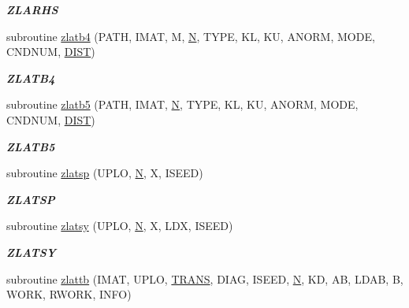 \begin{DoxyCompactItemize}
\begin{DoxyCompactList}\small\item\em {\bfseries Z\+L\+A\+R\+H\+S} \end{DoxyCompactList}\item 
subroutine \hyperlink{group__complex16__lin_gacb8311402101469baef52e042bd23703}{zlatb4} (P\+A\+T\+H, I\+M\+A\+T, M, \hyperlink{polmisc_8c_a0240ac851181b84ac374872dc5434ee4}{N}, T\+Y\+P\+E, K\+L, K\+U, A\+N\+O\+R\+M, M\+O\+D\+E, C\+N\+D\+N\+U\+M, \hyperlink{superlu__enum__consts_8h_af00a42ecad444bbda75cde1b64bd7e72ac04fbbdf0d80a4ad25e565541deeebd7}{D\+I\+S\+T})
\begin{DoxyCompactList}\small\item\em {\bfseries Z\+L\+A\+T\+B4} \end{DoxyCompactList}\item 
subroutine \hyperlink{group__complex16__lin_gaea342a83761879ef6a3174f201824b5e}{zlatb5} (P\+A\+T\+H, I\+M\+A\+T, \hyperlink{polmisc_8c_a0240ac851181b84ac374872dc5434ee4}{N}, T\+Y\+P\+E, K\+L, K\+U, A\+N\+O\+R\+M, M\+O\+D\+E, C\+N\+D\+N\+U\+M, \hyperlink{superlu__enum__consts_8h_af00a42ecad444bbda75cde1b64bd7e72ac04fbbdf0d80a4ad25e565541deeebd7}{D\+I\+S\+T})
\begin{DoxyCompactList}\small\item\em {\bfseries Z\+L\+A\+T\+B5} \end{DoxyCompactList}\item 
subroutine \hyperlink{group__complex16__lin_gaaa1d73e40a1923d773364071f0d868c6}{zlatsp} (U\+P\+L\+O, \hyperlink{polmisc_8c_a0240ac851181b84ac374872dc5434ee4}{N}, X, I\+S\+E\+E\+D)
\begin{DoxyCompactList}\small\item\em {\bfseries Z\+L\+A\+T\+S\+P} \end{DoxyCompactList}\item 
subroutine \hyperlink{group__complex16__lin_ga2494e654692b79e367a4c5cfcdb83ec7}{zlatsy} (U\+P\+L\+O, \hyperlink{polmisc_8c_a0240ac851181b84ac374872dc5434ee4}{N}, X, L\+D\+X, I\+S\+E\+E\+D)
\begin{DoxyCompactList}\small\item\em {\bfseries Z\+L\+A\+T\+S\+Y} \end{DoxyCompactList}\item 
subroutine \hyperlink{group__complex16__lin_ga0c19baa73f3b0c8a185eae2f9ed474f9}{zlattb} (I\+M\+A\+T, U\+P\+L\+O, \hyperlink{superlu__enum__consts_8h_a0c4e17b2d5cea33f9991ccc6a6678d62a1f61e3015bfe0f0c2c3fda4c5a0cdf58}{T\+R\+A\+N\+S}, D\+I\+A\+G, I\+S\+E\+E\+D, \hyperlink{polmisc_8c_a0240ac851181b84ac374872dc5434ee4}{N}, K\+D, A\+B, L\+D\+A\+B, B, W\+O\+R\+K, R\+W\+O\+R\+K, I\+N\+F\+O)

\end{DoxyCompactItemize}
